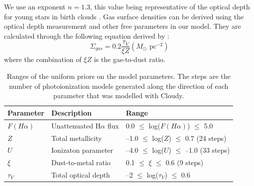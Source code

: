 \documentclass[fleqn,usenatbib]{mnras}
\begin{document}
We use an exponent $n = 1.3$, this value being representative of the optical depth for young stars in birth clouds \citep{dacunha2008}. Gas surface densities can be derived using the optical depth measurement and other free parameters in our model. They are calculated through the following equation derived by \cite{brinchmann2013}: 
\begin{equation}
    \label{eq:gas_equation_brinchmann}
    \Sigma_{gas} = 0.2 \frac{\tau_{V}}{\xi Z} (M_{\odot}\textrm{ pc}^{-2})
\end{equation}
where the combination of $\xi Z$ is the gas-to-dust ratio.
\begin{table}
 \centering
 \caption{Ranges of the uniform priors on the model parameters. The steps are the number of photoionization models generated along the direction of each parameter that was modelled with Cloudy.}
 \label{tab:model_priors}
\begin{tabularx}{\columnwidth}{lll}
\hline
\hline
\textbf{Parameter} & \textbf{Description}            & \textbf{Range}                                \\ \hline
$F(H\alpha)$      & Unattenuated H$\alpha$ flux     & 0.0 $\leq$ log($F(H\alpha)$) $\leq$ 5.0      \\
$Z$                & Total metallicity               & --1.0 $\leq$ log($Z$) $\leq$ 0.7 (24 steps)   \\
$U$                & Ionizaton parameter             & --4.0 $\leq$ log($U$) $\leq$ --1.0 (33 steps) \\
$\xi$              & Dust-to-metal ratio             & 0.1 $\leq$ $\xi$ $\leq$ 0.6 (9 steps)         \\
$\tau_{V}$         & Total optical depth          & --2 $\leq$ log($\tau_{V}$) $\leq$ 0.6             \\
\hline
\end{tabularx}
\end{table}
\end{document}

